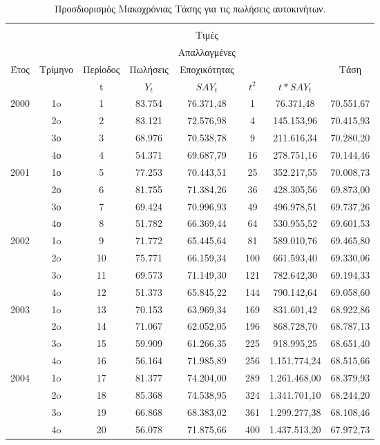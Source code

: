 \begin{table} [h]
  \caption{Προσδιορισμός Μακοχρόνιας Τάσης για τις πωλήσεις αυτοκινήτων.} 
  \label{tab_3}
  \begin{center}
    \begin{tabular}{|c|c|c|c|c|c|c|c|}
      \hline
           &   &    &    &         
           &   &    &      \\
           &    &     &    & Τιμές
           &  &     &  \\
           &  &  &  &Απαλλαγμένες &  &  &\\
       Έτος &Τρίμηνο  &Περίοδος  &Πωλήσεις  &Εποχικότητας  &  &  & Τάση \\
       & & t  & $Y_t$  & $ SAY_t$  & $t^2$  & $t*SAY_t$  &   \\
      \hline \hline
      2000 &  1o  &  1  &  83.754  &  76.371,48  &  1  & 76.371,48  &  70.551,67\\
           &  2o  &  2  &  83.121  &  72.576,98  &  4  & 145.153,96  &  70.415,93\\
           & 3ο & 3  &  68.976 & 70.538,78  & 9  & 211.616,34 & 70.280,20 \\
           & 4ο & 4 & 54.371 & 69.687,79 & 16  & 278.751,16 & 70.144,46 \\
           
        2001   & 1ο & 5  & 77.253  & 70.443,51  &  25 & 352.217,55 &  70.008,73\\
        & 2ο & 6 & 81.755 & 71.384,26 & 36  & 428.305,56 & 69.873,00\\
        & 3ο & 7  &69.424  & 70.996,93 & 49 & 496.978,51 & 69.737,26\\
        & 4ο &8  & 51.782 & 66.369,44 & 64 & 530.955,52 & 69.601,53\\
     2002   & 1o & 9 & 71.772 & 65.445,64 & 81 & 589.010,76 & 69.465,80 \\
     & 2o  & 10 & 75.771 & 66.159,34 & 100 & 661.593,40 & 69.330,06\\
     & 3o & 11 & 69.573 & 71.149,30 & 121 & 782.642,30 & 69.194,33\\
     & 4o & 12 & 51.373 & 65.845,22 &  144 & 790.142,64 &69.058,60\\
   2003  & 1o & 13 &70.153  & 63.969,34 & 169 & 831.601,42  &68.922,86\\
     & 2o & 14 &71.067 & 62.052,05 & 196 & 868.728,70 & 68.787,13\\
     & 3o & 15 & 59.909  & 61.266,35 & 225  & 918.995,25 &68.651,40\\
      & 4o & 16 & 56.164 & 71.985,89 & 256 & 1.151.774,24 & 68.515,66\\
      2004& 1o &  17& 81.377 & 74.204,00 & 289 & 1.261.468,00 & 68.379,93\\
      & 2o & 18 & 85.368 & 74.538,95  & 324 & 1.341.701,10 &68.244,20\\
      & 3o &19  & 66.868 & 68.383,02 & 361 & 1.299.277,38 &68.108,46\\
      & 4o & 20 & 56.078 & 71.875,66 & 400 & 1.437.513,20 &67.972,73\\
     

\end{tabular}
\end{center}
\end{table}
